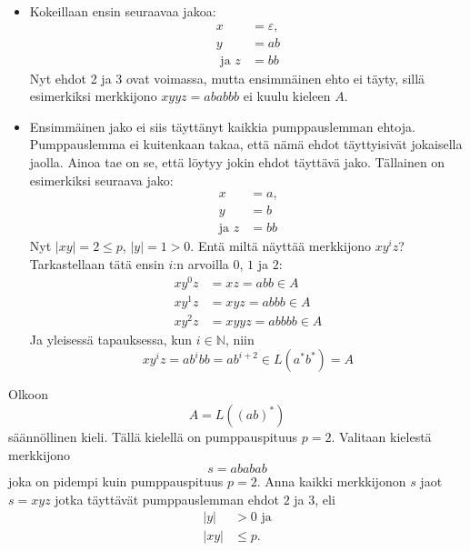 \documentclass[a4paper,11pt]{article}
\theoremstyle{definition}
\newcommand{\Nat}{\mathbb{N}}
\begin{document}
\begin{itemize}
    \item Kokeillaan ensin seuraavaa jakoa:
        \begin{align*}
             x               & = \varepsilon,  \\
             y               & = ab            \\
            \textrm{ ja }  z & = bb
        \end{align*}
        Nyt ehdot 2 ja 3 ovat voimassa, mutta ensimmäinen ehto ei täyty, sillä
        esimerkiksi merkkijono $xyyz = ababbb$ ei kuulu kieleen $A$.

    \item Ensimmäinen jako ei siis täyttänyt kaikkia pumppauslemman ehtoja.
        Pumppauslemma ei kuitenkaan takaa, että nämä ehdot täyttyisivät
        jokaisella jaolla. Ainoa tae on se, että löytyy jokin ehdot täyttävä
        jako. Tällainen on esimerkiksi seuraava jako:
        \begin{align*}
            x              & = a \textrm{,} \\
            y              & = b \\
            \textrm{ja } z & = bb
        \end{align*}
        Nyt $|xy| = 2 \leq p$, $|y| = 1 > 0$. Entä miltä näyttää merkkijono
        $xy^iz$? Tarkastellaan tätä ensin $i$:n arvoilla $0$, $1$ ja $2$:
        \begin{align*}
            xy^0z & = xz  = abb \in A \\
            xy^1z & = xyz = abbb \in A \\
            xy^2z & = xyyz = abbbb \in A
        \end{align*}
        Ja yleisessä tapauksessa, kun $i \in \Nat$, niin
        \begin{equation*}
            xy^iz = ab^ibb = ab^{i+2} \in L(a^*b^*) = A
        \end{equation*}
\end{itemize}

\begin{exercise}
    Olkoon
    \begin{equation*}
        A = L((ab)^*)
    \end{equation*}
    säännöllinen kieli. Tällä kielellä on pumppauspituus $p = 2$. Valitaan
    kielestä merkkijono
    \begin{equation*}
        s = ababab
    \end{equation*}
    joka on pidempi kuin pumppauspituus $p = 2$.  Anna kaikki merkkijonon $s$
    jaot $s = xyz$ jotka täyttävät pumppauslemman ehdot $2$ ja $3$, eli 
    \begin{align*}
        |y|  & > 0 \textrm{ ja} \\
        |xy| & \leq p \text{.}
    \end{align*}
\end{exercise}
\end{document}
